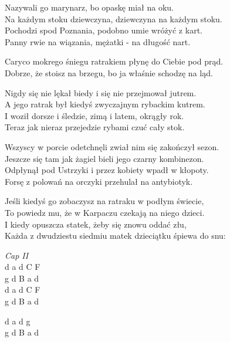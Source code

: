 \begin{text}
    \ifOneCol \else \footnotesize{ \fi
    \chordfill
    Nazywali go marynarz, bo opaskę miał na oku.\\
    Na każdym stoku dziewczyna, dziewczyna na każdym stoku.\\
    Pochodzi spod Poznania, podobno umie wróżyć z kart.\\
    Panny rwie na wiązania, mężatki - na długość nart.

    Caryco mokrego śniegu ratrakiem płynę do Ciebie pod prąd.\\
    Dobrze, że stoisz na brzegu, bo ja właśnie schodzę na ląd.

    Nigdy się nie lękał biedy i się nie przejmował jutrem.\\
    A jego ratrak był kiedyś zwyczajnym rybackim kutrem.\\
    I woził dorsze i śledzie, zimą i latem, okrągły rok.\\
    Teraz jak nieraz przejedzie rybami czuć cały stok.

    Wszyscy w porcie odetchnęli zwiał nim się zakończył sezon.\\
    Jeszcze się tam jak żagiel bieli jego czarny kombinezon.\\
    Odpłynął pod Ustrzyki i przez kobiety wpadł w kłopoty.\\
    Forsę z polowań na orczyki przehulał na antybiotyk.

    Jeśli kiedyś go zobaczysz na ratraku w podłym świecie,\\
    To powiedz mu, że w Karpaczu czekają na niego dzieci.\\
    I kiedy opuszcza statek, żeby się znowu oddać złu,\\
    Każda z dwudziestu siedmiu matek dzieciątku śpiewa do snu:
    \ifOneCol \else } \fi
\end{text}
\begin{chord}
    \ifOneCol \else \footnotesize{ \fi
    \textit{Cap II}\\
    d a d C F\\
    g d B a d\\
    d a d C F\\
    g d B a d

    d a d g\\
    g d B a d
    \ifOneCol \else } \fi
\end{chord}